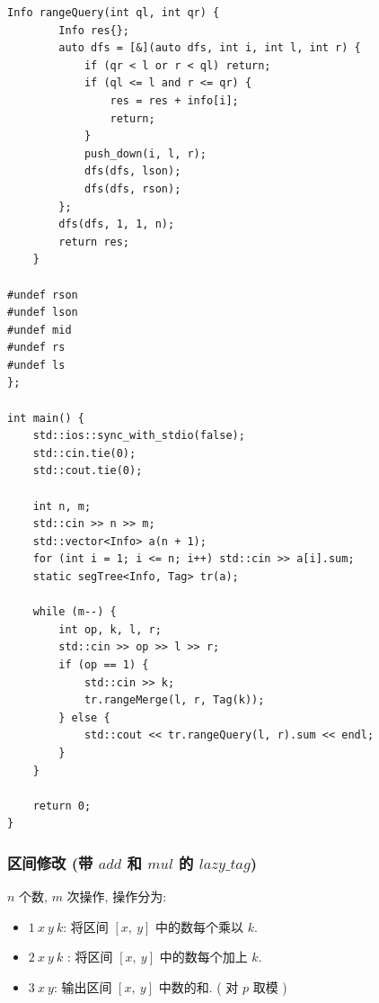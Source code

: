 \documentclass[UTF8, a4paper, titlepage, twoside]{ctexart}
\begin{document}
\begin{lstlisting}[style = cpp]
    Info rangeQuery(int ql, int qr) {
        Info res{};
        auto dfs = [&](auto dfs, int i, int l, int r) {
            if (qr < l or r < ql) return;
            if (ql <= l and r <= qr) {
                res = res + info[i];
                return;
            }
            push_down(i, l, r);
            dfs(dfs, lson);
            dfs(dfs, rson);
        };
        dfs(dfs, 1, 1, n);
        return res;
    }

#undef rson
#undef lson
#undef mid
#undef rs
#undef ls
};

int main() {
    std::ios::sync_with_stdio(false);
    std::cin.tie(0);
    std::cout.tie(0);

    int n, m;
    std::cin >> n >> m;
    std::vector<Info> a(n + 1);
    for (int i = 1; i <= n; i++) std::cin >> a[i].sum;
    static segTree<Info, Tag> tr(a);

    while (m--) {
        int op, k, l, r;
        std::cin >> op >> l >> r;
        if (op == 1) {
            std::cin >> k;
            tr.rangeMerge(l, r, Tag(k));
        } else {
            std::cout << tr.rangeQuery(l, r).sum << endl;
        }
    }

    return 0;
}
\end{lstlisting}

\subsubsection{ 区间修改 (带 $add$ 和 $mul$ 的 $lazy\_tag$) }
$n$ 个数, $m$ 次操作, 操作分为:

\begin{itemize}
\item $1 \ x \ y \ k$: 将区间 $[x, \ y]$ 中的数每个乘以 $k$. 
\item $2 \ x \ y \ k$ : 将区间 $[x, \ y]$ 中的数每个加上 $k$. 
\item $3 \ x \ y$: 输出区间 $[x, \ y]$ 中数的和. ( 对 $p$ 取模 )
\end{itemize}
\end{document}
